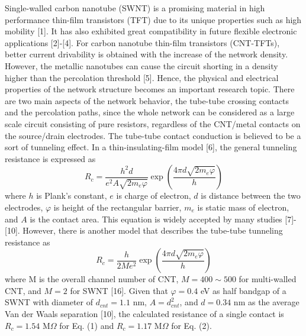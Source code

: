\documentclass[letterpaper, 10 pt, conference]{ieeeconf}
\begin{document}
Single-walled carbon nanotube (SWNT) is a promising material in high performance thin-film transistors (TFT) due to its unique properties such as high mobility [1]. It has also exhibited great compatibility in future flexible electronic applications [2]-[4]. For carbon nanotube thin-film transistors (CNT-TFTs), better current drivability is obtained with the increase of the network density. However, the metallic nanotubes can cause the circuit shorting in a density higher than the percolation threshold [5]. Hence, the physical and electrical properties of the network structure becomes an important research topic. There are two main aspects of the network behavior, the tube-tube crossing contacts and the percolation paths, since the whole network can be considered as a large scale circuit consisting of pure resistors, regardless of the CNT/metal contacts on the source/drain electrodes. The tube-tube contact conduction is believed to be a sort of tunneling effect. In a thin-insulating-film model [6], the general tunneling resistance is expressed as
\begin{equation}
  R_c=\frac{h^2d}{e^2A\sqrt{2m_e\varphi}}\exp(\frac{4\pi d\sqrt{2m_e\varphi}}{h})
\end{equation}
where $h$ is Plank's constant, $e$ is charge of electron, $d$ is distance between the two electrodes, $\varphi$ is height of the rectangular barrier, $m_e$ is static mass of electron, and $A$ is the contact area. This equation is widely accepted by many studies [7]-[10]. However, there is another model that describes the tube-tube tunneling resistance as
\begin{equation}
  R_c=\frac{h}{2Me^2}\exp(\frac{4\pi d\sqrt{2m_e\varphi}}{h})
\end{equation}
where M is the overall channel number of CNT, $M=400\sim 500$ for multi-walled CNT, and $M=2$ for SWNT [16].
Given that $\varphi=0.4$ eV as half bandgap of a SWNT with diameter of $d_{cnt}=1.1$ nm, $A=d_{cnt}^2$, and $d=0.34$ nm as the average Van der Waals separation [10], the calculated resistance of a single contact is $R_c=1.54$ M$\Omega$ for Eq. (1) and $R_c=1.17$ M$\Omega$ for Eq. (2).
\end{document}
